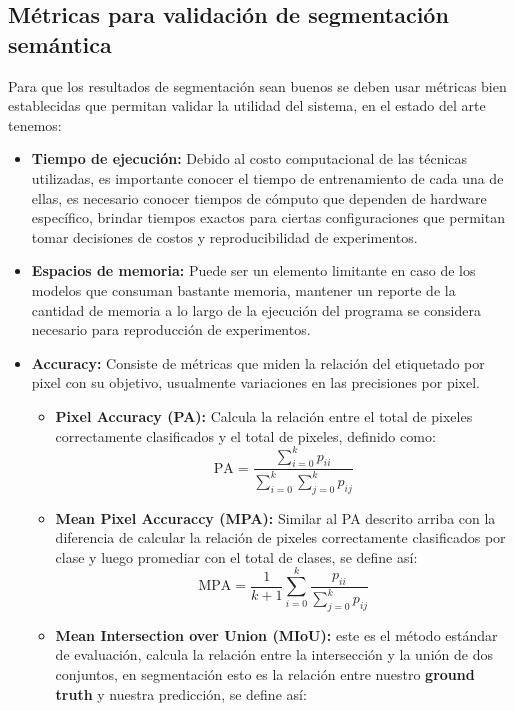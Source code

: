 \subsection{Métricas para validación de segmentación semántica}
Para que los resultados de segmentación sean buenos se deben usar métricas bien establecidas que permitan validar la utilidad del sistema, en el estado del arte tenemos:
\begin{itemize}
	\item \textbf{Tiempo de ejecución:} Debido al costo computacional de las técnicas utilizadas, es importante conocer el tiempo de entrenamiento de cada una de ellas, es necesario conocer tiempos de cómputo que dependen de hardware específico, brindar tiempos exactos para ciertas configuraciones que permitan tomar decisiones de costos y reproducibilidad de experimentos.
	\item \textbf{Espacios de memoria:} Puede ser un elemento limitante en caso de los modelos que consuman bastante memoria, mantener un reporte de la cantidad de memoria a lo largo de la ejecución del programa se considera necesario para reproducción de experimentos.
	\item \textbf{Accuracy:}  Consiste de métricas que miden la relación del etiquetado por pixel con su objetivo, usualmente variaciones en las precisiones por pixel.
     \begin{itemize}
			\item \textbf{Pixel Accuracy (PA):} Calcula la relación entre el total de pixeles correctamente clasificados y el total de pixeles, definido como: 
			\begin{equation}
			    \text{PA} = \frac{\sum^k_{i=0}p_{ii}}{\sum_{i=0}^{k}\sum_{j=0}^{k} p_{ij}}
			    \end{equation}
			\item \textbf{Mean Pixel Accuraccy (MPA):} Similar al PA descrito arriba con la diferencia de calcular la relación de pixeles correctamente clasificados por clase y luego promediar con el total de clases, se define así:
				\begin{equation}
				\text{MPA} = \frac{1}{k+1}\sum_{i=0}^k\frac{p_{ii}}{\sum_{j=0}^kp_{ij}}
				\end{equation}
			\item \textbf{Mean Intersection over Union (MIoU):} este es el método estándar de evaluación, calcula la relación entre la intersección y la unión de dos conjuntos, en segmentación esto es la relación entre nuestro \textbf{ground truth} y nuestra predicción, se define así: 

\end{itemize}
\end{itemize}
